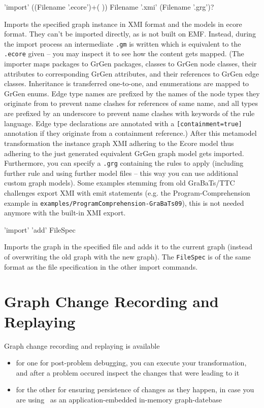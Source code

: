 \begin{rail}
  'import' ((Filename '.ecore')+( )) Filename '.xmi' (Filename '.grg')?
\end{rail}\label{shellecoreexport}
Imports the specified graph instance in XMI format and the models in ecore format.
They can't be imported directly, as \GrG{ } is not built on EMF.
Instead, during the import process an intermediate \texttt{.gm} is written which is equivalent to the \texttt{.ecore} given -- you may inspect it to see how the content gets mapped.
(The importer maps packages to GrGen packages, classes to GrGen node classes, their attributes to corresponding GrGen attributes, and their references to GrGen edge classes.
Inheritance is transferred one-to-one, and enumerations are mapped to GrGen enums.
Edge type names are prefixed by the names of the node types they originate from to prevent name clashes for references of same name,
and all types are prefixed by an underscore to prevent name clashes with keywords of the rule language.
Edge type declarations are annotated with a \verb#[containment=true]# annotation if they originate from a containment reference.)
After this metamodel transformation the instance graph XMI adhering to the Ecore model thus adhering to the just
generated equivalent GrGen graph model gets imported.
Furthermore, you can specify a \texttt{.grg} containing the rules to apply (including further rule and using further model files -- this way you can use additional custom graph models).
Some examples stemming from old GraBaTs/TTC challenges export XMI with emit statements (e.g. the Program-Comprehension example in \texttt{examples/ProgramComprehension-GraBaTs09}), this is not needed anymore with the built-in XMI export.

\begin{rail}
  'import' 'add' FileSpec
\end{rail}
Imports the graph in the specified file and adds it to the current graph
(instead of overwriting the old graph with the new graph).
The \texttt{FileSpec} is of the same format as the file specification in the other import commands.


\section{Graph Change Recording and Replaying}
\label{recordnreplay}

Graph change recording and replaying is available 
\begin{itemize}
	\item for one for post-problem debugging, you can execute your transformation, and after a problem occured inspect the changes that were leading to it
	\item for the other for ensuring persistence of changes as they happen, in case you are using \GrG\ as an application-embedded in-memory graph-datebase
\end{itemize}

